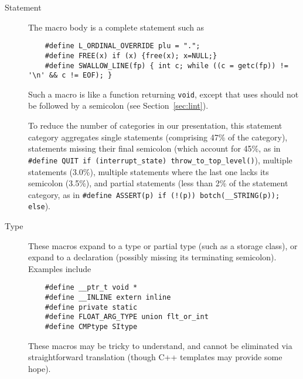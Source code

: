 \documentclass[10pt]{article}
\begin{document}
\begin{description}
\item[Statement]\label{item:statement-category}
  The macro body is a complete statement such as
\begin{verbatim}
    #define L_ORDINAL_OVERRIDE plu = ".";
    #define FREE(x) if (x) {free(x); x=NULL;}
    #define SWALLOW_LINE(fp) { int c; while ((c = getc(fp)) != '\n' && c != EOF); }
\end{verbatim}
  Such a macro is like a function returning {\tt void}, except that uses
  should not be followed by a semicolon (see Section~\ref{sec:lint}).
    
  To reduce the number of categories in our presentation, this statement
  category aggregates single statements (comprising 47\% of the category),
  statements missing their final semicolon (which account for 45\%, as in
  {\tt \#define QUIT if (\verb|interrupt_state|)
  \verb|throw_to_top_level|()}), multiple statements (3.0\%), multiple
statements where the last one lacks its semicolon (3.5\%), and partial
statements (less than 2\% of the statement category, as in {\tt \#define
ASSERT(p) if (!(p)) botch(\verb|__STRING|(p)); else}).

\item[Type] 
  These macros expand to a type or partial type (such as a storage class),
  or expand to a declaration (possibly missing its terminating semicolon).
  Examples include
\begin{verbatim}
    #define __ptr_t void *
    #define __INLINE extern inline
    #define private static
    #define FLOAT_ARG_TYPE union flt_or_int
    #define CMPtype SItype
\end{verbatim}
  These macros may be tricky to understand, and cannot be eliminated via
  straightforward translation (though C++ templates may provide some hope).




\end{description}
\end{document}
